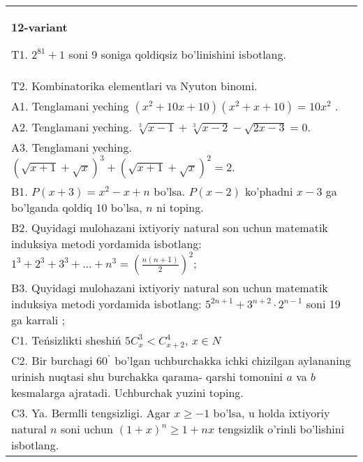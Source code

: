 \documentclass{article}
\begin{document}
\begin{tabular}{m{17cm}}
\textbf{12-variant}
\newline

T1. \(2^{81} + 1\) soni 9 soniga qoldiqsiz bo'linishini isbotlang. \\
T2. Kombinatorika elementlari va Nyuton binomi. \\
A1. Tenglamani yeching \(\left( x^{2} + 10x + 10 \right)\left( x^{2} + x + 10 \right) = 10x^{2}\) . \\
A2. Tenglamani yeching. \(\sqrt[3]{x - 1} + \sqrt[3]{x - 2} - \sqrt{2x - 3} = 0\). \\
A3. Tenglamani yeching. \((\sqrt{x + 1} + \sqrt{x})^{3} + (\sqrt{x + 1} + \sqrt{x})^{2} = 2\). \\
B1. \(P(x + 3) = x^{2} - x + n\) bo'lsa. \(P(x - 2)\) ko'phadni \(x - 3\) ga bo'lganda qoldiq \(10\) bo'lsa, \(n\) ni toping. \\
B2. Quyidagi mulohazani ixtiyoriy natural son uchun matematik induksiya metodi yordamida isbotlang: \(1^{3} + 2^{3} + 3^{3} + ... + n^{3} = \left( \frac{n(n + 1)}{2} \right)^{2}\); \\
B3. Quyidagi mulohazani ixtiyoriy natural son uchun matematik induksiya metodi yordamida isbotlang: \(5^{2n + 1} + 3^{n + 2} \cdot 2^{n - 1}\) soni 19 ga karrali ; \\
C1. Teńsizlikti sheshiń \(5C_{x}^{3} < C_{x + 2}^{4}\), \(x \in N\) \\
C2. Bir burchagi \(60^{{^\circ}}\) bo'lgan uchburchakka ichki chizilgan aylananing urinish nuqtasi shu burchakka qarama- qarshi tomonini \(a\) va \(b\) kesmalarga ajratadi. Uchburchak yuzini toping. \\
C3. Ya. Bermlli tengsizligi. Agar \(x \geq - 1\) bo'lsa, u holda ixtiyoriy natural \(n\) soni uchun \((1 + x)^{n} \geq 1 + nx\) tengsizlik o'rinli bo'lishini isbotlang. \\

\end{tabular}
\vspace{1cm}
\end{document}
